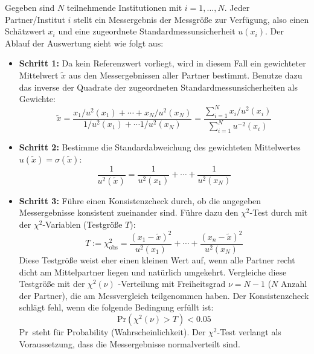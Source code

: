 Gegeben sind $N$ teilnehmende Institutionen mit $i=1,\dots,N$. Jeder
Partner/Institut $i$ stellt ein Messergebnis der Messgröße zur Verfügung, also einen Schätzwert $x_i$ und eine zugeordnete Standardmessunsicherheit
$u(x_i)$.
Der Ablauf der Auswertung sieht wie folgt aus:
\begin{itemize}
\item \textbf{Schritt 1:}  \newline
Da kein Referenzwert vorliegt, wird in diesem Fall ein gewichteter Mittelwert $\tilde x$ aus den Messergebnissen aller Partner bestimmt. Benutze dazu das inverse der Quadrate der zugeordneten Standardmessunsicherheiten als Gewichte: 
\begin{equation}
\tilde x = \frac{x_1/u^2(x_1)+ \cdots + x_N/u^2(x_N)}{1/u^2(x_1)+ \cdots 1/u^2(x_N)} = \frac{\sum\limits_{i=1}^{N} x_i / u^2(x_i)}
{\sum\limits_{i=1}^{N} u^{-2}(x_i)}
\label{referenzgleichepartner}
\end{equation}
\item \textbf{Schritt 2:}  \newline
Bestimme die Standardabweichung des gewichteten Mittelwertes $u(\tilde x)=\sigma(\tilde x)$:
\begin{equation}
\frac{1}{u^2(\tilde x)} = \frac{1}{u^2(x_1)} +\cdots + \frac{1}{u^2(x_N)}
\label{eq:Standardabweichung_Mittelwert}
\end{equation}
\item \textbf{Schritt 3:}  \newline
Führe einen Konsistenzcheck durch, ob die angegeben Messergebnisse
konsistent zueinander sind. Führe dazu den $\chi^2$-Test
durch mit der $\chi^2$-Variablen (Testgröße $T$): 
\begin{equation}
T := \chi^2_\mathrm{obs} = \frac{(x_1 - \tilde x)^2}{u^2(x_1)} + \cdots + 
\frac{(x_n-\tilde x)^2}{u^2(x_N)}
\label{eq:T_for_consistencecheck}
\end{equation}
Diese Testgröße weist eher einen kleinen Wert auf, wenn alle Partner 
recht dicht am Mittelpartner liegen und natürlich umgekehrt. 
Vergleiche diese Testgröße mit der $\chi^2 (\nu)$ -Verteilung 
mit Freiheitsgrad $\nu = N-1$ ($N$ Anzahl der Partner), 
die am Messvergleich teilgenommen haben. 
Der Konsistenzcheck schlägt fehl, wenn die folgende Bedingung
erfüllt ist: 
\begin{equation}
\mathrm{Pr}\left(\chi^2(\nu) > T\right) < 0.05
\label{eq:consistencecheck}
\end{equation}
\glqq Pr\grqq~steht für \glqq Probability (Wahrscheinlichkeit)\grqq.
Der $\chi^2$-Test verlangt als Voraussetzung, dass die Messergebnisse
normalverteilt sind. 


\end{itemize}
